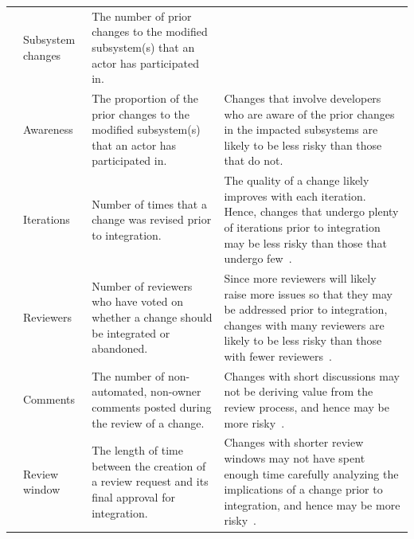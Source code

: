 \begin{table}[ht!]
{\begin{tabular}{|c|p{2cm}|p{5.7cm}|p{8.4cm}|}
			\cline{2-3}
			& Subsystem changes & The number of prior changes to the modified subsystem(s) that an actor has participated in. & \\
			\cline{2-4}
			& Awareness & The proportion of the prior changes to the modified subsystem(s) that an actor has participated in. & Changes that involve developers who are aware of the prior changes in the impacted subsystems are likely to be less risky than those that do not. \\
			\hline
			\multirow{12}{*}{\rotatebox{90}{Review}}
			& Iterations & Number of times that a change was revised prior to integration. & The quality of a change likely improves with each iteration. Hence, changes that undergo plenty of iterations prior to integration may be less risky than those that undergo few~\cite{porter1998tosem, thongtanunam2015msr}.\\
			\cline{2-4}
			& Reviewers & Number of reviewers who have voted on whether a change should be integrated or abandoned. & Since more reviewers will likely raise more issues so that they may be addressed prior to integration, changes with many reviewers are likely to be less risky than those with fewer reviewers~\cite{Raymond2001}. \\
			\cline{2-4}
			& Comments & The number of non-automated, non-owner comments posted during the review of a change. & Changes with short discussions may not be deriving value from the review process, and hence may be more risky~\cite{mcintosh2014impact, mcintosh2016empirical}.\\
			\cline{2-4}
			& Review window & The length of time between the creation of a review request and its final approval for integration. & Changes with shorter review windows may not have spent enough time carefully analyzing the implications of a change prior to integration, and hence may be more risky~\cite{porter1998tosem, thongtanunam2015msr}.\\
			\hline
		\end{tabular}
	}
\end{table}

